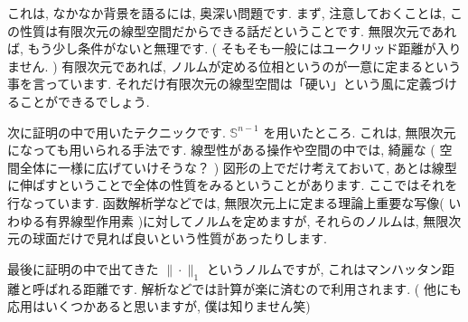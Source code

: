 \documentclass[dvipdfmx,uplatex,11pt]{jsarticle}
\begin{document}
これは, なかなか背景を語るには, 奥深い問題です. まず, 注意しておくことは, この性質は有限次元の線型空間だからできる話だということです. 無限次元であれば, もう少し条件がないと無理です. ( そもそも一般にはユークリッド距離が入りません. ) 有限次元であれば, ノルムが定める位相というのが一意に定まるという事を言っています. それだけ有限次元の線型空間は「硬い」という風に定義づけることができるでしょう. \par
次に証明の中で用いたテクニックです.  $\mathbb S^{n-1}$ を用いたところ. これは, 無限次元になっても用いられる手法です. 線型性がある操作や空間の中では, 綺麗な ( 空間全体に一様に広げていけそうな？ ) 図形の上でだけ考えておいて, あとは線型に伸ばすということで全体の性質をみるということがあります. ここではそれを行なっています. 函数解析学などでは, 無限次元上に定まる理論上重要な写像( いわゆる有界線型作用素 )に対してノルムを定めますが, それらのノルムは, 無限次元の球面だけで見れば良いという性質があったりします. \par
最後に証明の中で出てきた $\| \cdot \| _ 1$ というノルムですが, これはマンハッタン距離と呼ばれる距離です. 解析などでは計算が楽に済むので利用されます. ( 他にも応用はいくつかあると思いますが, 僕は知りません笑)
\newpage
\end{document}
